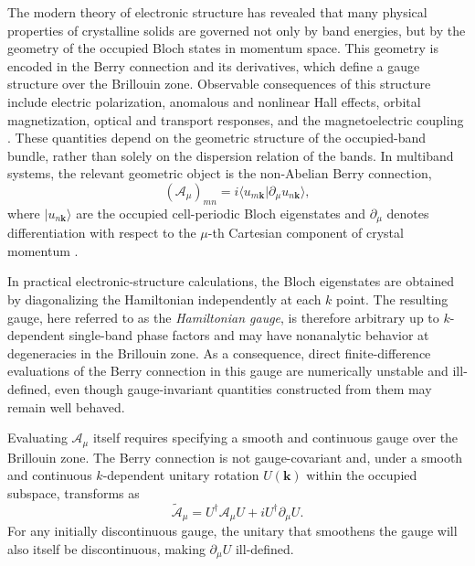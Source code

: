 \documentclass[galley,aps,pra,10pt,amsmath,amssymb,
    superscriptaddress,nofootinbib,longbibliography]{revtex4-2}
\begin{document}
The modern theory of electronic structure has revealed that many physical properties of crystalline solids are governed not only by band energies, but by the geometry of the occupied Bloch states in momentum space. This geometry is encoded in the Berry connection and its derivatives, which define a gauge structure over the Brillouin zone. Observable consequences of this structure include electric polarization, anomalous and nonlinear Hall effects, orbital magnetization, optical and transport responses, and the magnetoelectric coupling \cite{xiao2010}. These quantities depend on the geometric structure of the occupied-band bundle, rather than solely on the dispersion relation of the bands. In multiband systems, the relevant geometric object is the non-Abelian Berry connection, 
\begin{equation}
    \label{eq:berry_connection}
    \left( \mathcal{A}_\mu \right)_{mn}
    =
    i \langle u_{m\mathbf{k}} | \partial_{\mu} u_{n\mathbf{k}} \rangle ,
\end{equation}
where $|u_{n\mathbf{k}}\rangle$ are the occupied cell-periodic Bloch eigenstates and $\partial_{\mu}$ denotes differentiation with respect to the $\mu$-th Cartesian component of crystal momentum \cite{Vanderbilt_2018}.

In practical electronic-structure calculations, the Bloch eigenstates are obtained by diagonalizing the Hamiltonian independently at each $k$ point. The resulting gauge, here referred to as the \emph{Hamiltonian gauge}, is therefore arbitrary up to $k$-dependent single-band phase factors and may have nonanalytic behavior at degeneracies in the Brillouin zone. As a consequence, direct finite-difference evaluations of the Berry connection in this gauge are numerically unstable and ill-defined, even though gauge-invariant quantities constructed from them may remain well behaved.

Evaluating $\mathcal{A}_\mu$ itself requires specifying a smooth and continuous gauge over the Brillouin zone. The Berry connection is not gauge-covariant and, under a smooth and continuous $k$-dependent unitary rotation $U(\mathbf{k})$ within the occupied subspace, transforms as
\begin{equation}
\label{eq:tildeA}
    \tilde{\mathcal{A}}_\mu
    =
    U^\dagger \mathcal{A}_\mu U
    + i U^\dagger \partial_{\mu} U .
\end{equation}
For any initially discontinuous gauge, the unitary that smoothens the gauge will also itself be discontinuous, making $\partial_{\mu} U$ ill-defined. 
\end{document}
